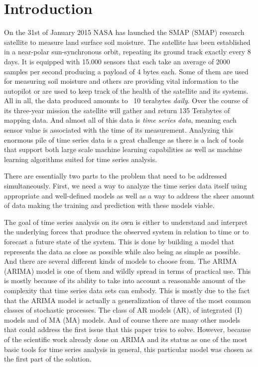 
\chapter{Introduction}

On the 31st of January 2015 \acs{NASA} has launched the \acl{SMAP} (\acs{SMAP}) research satellite to measure land surface soil moisture. The satellite has been established in a near-polar sun-synchronous orbit, repeating its ground track exactly every 8 days. It is equipped with 15.000 sensors that each take an average of 2000 samples per second producing a payload of 4 bytes each. Some of them are used for measuring soil moisture and others are providing vital information to the autopilot or are used to keep track of the health of the satellite and its systems.\textsuperscript{\cite{NASASMAPSpecifications}}
All in all, the data produced amounts to ~10 terabytes \textit{daily}. Over the course of its three-year mission the satellite will gather and return 135 Terabytes of mapping data. And almost all of this data is\textit{ time series data}, meaning each sensor value is associated with the time of its measurement.\textsuperscript{\cite{NASASMAPProducts}} Analyzing this enormous pile of time series data is a great challenge as there is a lack of tools that support both large scale machine learning capabilities as well as machine learning algorithms suited for time series analysis.

There are essentially two parts to the problem that need to be addressed simultaneously. First, we need a way to analyze the time series data itself using appropriate and well-defined models as well as a way to address the sheer amount of data making the training and prediction with these models viable.

The goal of time series analysis on its own is either to understand and interpret the underlying forces that produce the observed system in relation to time or to forecast a future state of the system.\textsuperscript{\cite{Anandh2016EverythingData}} This is done by building a model that represents the data as close as possible while also being as simple as possible. And there are several different kinds of models to choose from. The \acl{ARIMA} (\acs{ARIMA}) model is one of them and wildly spread in terms of practical use. This is mostly because of its ability to take into account a reasonable amount of the complexity that time series data sets can embody. This is mostly due to the fact that the \acs{ARIMA} model is actually a generalization of three of the most common classes of stochastic processes.  The class of \acl{AR} models (\acs{AR}), of integrated (I) models and of \acl{MA} (\acs{MA}) models. 
And of course there are many other models that could address the first issue that this paper tries to solve. However, because of the scientific work already done on \acs{ARIMA} and its status as one of the most basic tools for time series analysis in general, this particular model was chosen as the first part of the solution.

